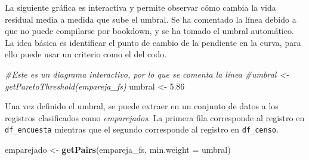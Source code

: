 \documentclass[
  12pt,
]{book}
\newenvironment{Shaded}{\begin{snugshade}}{\end{snugshade}}
\newcommand{\AttributeTok}[1]{\textcolor[rgb]{0.13,0.29,0.53}{#1}}
\newcommand{\CommentTok}[1]{\textcolor[rgb]{0.56,0.35,0.01}{\textit{#1}}}
\newcommand{\FloatTok}[1]{\textcolor[rgb]{0.00,0.00,0.81}{#1}}
\newcommand{\FunctionTok}[1]{\textcolor[rgb]{0.13,0.29,0.53}{\textbf{#1}}}
\newcommand{\NormalTok}[1]{#1}
\newcommand{\OtherTok}[1]{\textcolor[rgb]{0.56,0.35,0.01}{#1}}
\begin{document}
La siguiente gráfica es interactiva y permite observar cómo cambia la vida residual media a medida que sube el umbral. Se ha comentado la línea debido a que no puede compilarse por bookdown, y se ha tomado el umbral automático. La idea básica es identificar el punto de cambio de la pendiente en la curva, para ello puede usar un criterio como el del codo.

\begin{Shaded}
\begin{Highlighting}[]
\CommentTok{\#Este es un diagrama interactivo, por lo que se comenta la línea }
\CommentTok{\#umbral \textless{}{-} getParetoThreshold(empareja\_fs) }
\NormalTok{umbral }\OtherTok{\textless{}{-}} \FloatTok{5.86}
\end{Highlighting}
\end{Shaded}

Una vez definido el umbral, se puede extraer en un conjunto de datos a los registros clasificados como \emph{emparejados}. La primera fila corresponde al registro en \texttt{df\_encuesta} mientras que el segundo corresponde al registro en \texttt{df\_censo}.

\begin{Shaded}
\begin{Highlighting}[]
\NormalTok{emparejado }\OtherTok{\textless{}{-}} \FunctionTok{getPairs}\NormalTok{(empareja\_fs, }\AttributeTok{min.weight =}\NormalTok{ umbral)}
\end{Highlighting}
\end{Shaded}
\end{document}

